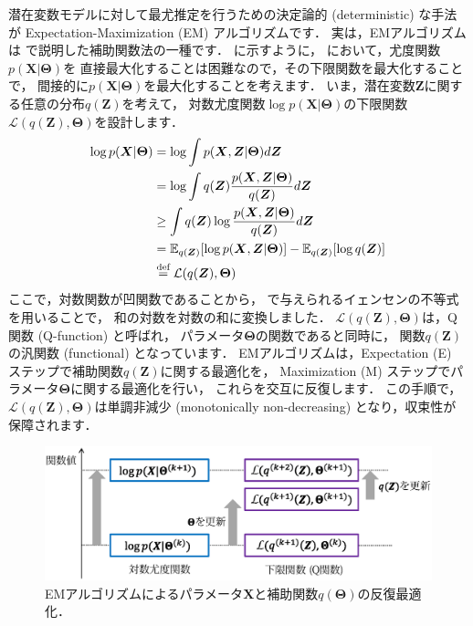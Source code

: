 潜在変数モデルに対して最尤推定を行うための決定論的 (deterministic) な手法が
Expectation-Maximization (EM) アルゴリズムです．
実は，EMアルゴリズムは
で説明した補助関数法の一種です．
に示すように，
において，尤度関数$p(\bm{X}|\bm\Theta)$を
直接最大化することは困難なので，その下限関数を最大化することで，
間接的に$p(\bm{X}|\bm\Theta)$を最大化することを考えます．
いま，潜在変数$\bm{Z}$に関する任意の分布$q(\bm{Z})$を考えて，
対数尤度関数$\log p(\bm{X}|\bm\Theta)$の下限関数$\mathcal{L}(q(\bm{Z}),\bm\Theta)$を設計します．
\begin{align}
 \log p(\bm{X}|\bm\Theta)
&= \log \int p(\bm{X},\bm{Z}|\bm\Theta) d\bm{Z}
 \nonumber\\
&= \log \int q(\bm{Z}) 
 \frac{p(\bm{X},\bm{Z}|\bm\Theta)}{q(\bm{Z})} d\bm{Z}
 \nonumber\\
&
 \ge \int q(\bm{Z})
 \log \frac{p(\bm{X},\bm{Z}|\bm\Theta)}{q(\bm{Z})} d\bm{Z}
 \nonumber\\
&
 = \mathbb{E}_{q(\bm{Z})}[\log p(\bm{X},\bm{Z}|\bm\Theta)]
 - \mathbb{E}_{q(\bm{Z})}[\log q(\bm{Z})]
 \nonumber\\
&
 \overset{\mbox{\scriptsize def}}{=} \mathcal{L}(q(\bm{Z}),\bm\Theta)
\label{eq:em_lower_bound}
\end{align}
ここで，対数関数が凹関数であることから，
で与えられるイェンセンの不等式を用いることで，
和の対数を対数の和に変換しました．
$\mathcal{L}(q(\bm{Z}),\bm\Theta)$は，Q関数 (Q-function) と呼ばれ，
パラメータ$\bm\Theta$の関数であると同時に，
関数$q(\bm{Z})$の汎関数 (functional) となっています．
EMアルゴリズムは，Expectation (E) ステップで補助関数$q(\bm{Z})$に関する最適化を，
Maximization (M) ステップでパラメータ$\bm\Theta$に関する最適化を行い，
これらを交互に反復します．
この手順で，$\mathcal{L}(q(\bm{Z}),\bm\Theta)$は単調非減少 (monotonically non-decreasing)
となり，収束性が保障されます．

\begin{figure}[t]
\centering
\includegraphics[width=.98\linewidth]{sections/optimization/em_update}
\vspace{-1mm}
\caption{EMアルゴリズムによるパラメータ$\bm{X}$と補助関数$q(\bm\Theta)$の反復最適化．}
\label{fig:em_update}
\end{figure}

